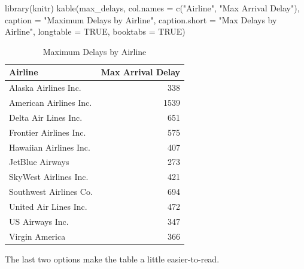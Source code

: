 \documentclass [11pt, proquest] {uwthesis}[2015/03/03]
\newenvironment{Shaded}{\begin{snugshade}}{\end{snugshade}}
\newcommand{\AttributeTok}[1]{\textcolor[rgb]{0.77,0.63,0.00}{#1}}
\newcommand{\ConstantTok}[1]{\textcolor[rgb]{0.00,0.00,0.00}{#1}}
\newcommand{\FunctionTok}[1]{\textcolor[rgb]{0.00,0.00,0.00}{#1}}
\newcommand{\NormalTok}[1]{#1}
\newcommand{\StringTok}[1]{\textcolor[rgb]{0.31,0.60,0.02}{#1}}
\begin{document}
\begin{Shaded}
\begin{Highlighting}[]
\FunctionTok{library}\NormalTok{(knitr)}
\FunctionTok{kable}\NormalTok{(max\_delays, }
      \AttributeTok{col.names =} \FunctionTok{c}\NormalTok{(}\StringTok{"Airline"}\NormalTok{, }\StringTok{"Max Arrival Delay"}\NormalTok{),}
      \AttributeTok{caption =} \StringTok{"Maximum Delays by Airline"}\NormalTok{,}
      \AttributeTok{caption.short =} \StringTok{"Max Delays by Airline"}\NormalTok{,}
      \AttributeTok{longtable =} \ConstantTok{TRUE}\NormalTok{,}
      \AttributeTok{booktabs =} \ConstantTok{TRUE}\NormalTok{)}
\end{Highlighting}
\end{Shaded}
\begin{longtable}[t]{lr}
\caption[Max Delays by Airline]{\label{tab:maxdelays}Maximum Delays by Airline}\\
\toprule
Airline & Max Arrival Delay\\
\midrule
Alaska Airlines Inc. & 338\\
American Airlines Inc. & 1539\\
Delta Air Lines Inc. & 651\\
Frontier Airlines Inc. & 575\\
Hawaiian Airlines Inc. & 407\\
\addlinespace
JetBlue Airways & 273\\
SkyWest Airlines Inc. & 421\\
Southwest Airlines Co. & 694\\
United Air Lines Inc. & 472\\
US Airways Inc. & 347\\
\addlinespace
Virgin America & 366\\
\bottomrule
\end{longtable}
The last two options make the table a little easier-to-read.
\end{document}
